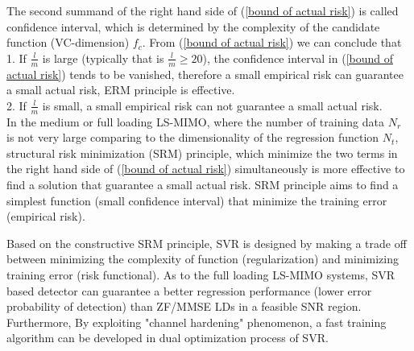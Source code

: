 \documentclass[10pt, draftclsnofoot, onecolumn]{IEEEtran}
\begin{document}
The second summand of the right hand side of (\ref{bound of actual risk}) is called confidence interval, which is determined by the complexity of the candidate function (VC-dimension) $f_{c}$\cite{vapnik1999overview}. From (\ref{bound of actual risk}) we can conclude that\\
1. If $\frac{l}{m}$ is large (typically that is $\frac{l}{m}\geq 20$), the confidence interval in (\ref{bound of actual risk}) tends to be vanished, therefore a small empirical risk can guarantee a small actual risk, ERM principle is effective.\\
2. If $\frac{l}{m}$ is small, a small empirical risk can not guarantee a small actual risk.\\
In the medium or full loading LS-MIMO, where the number of training data $N_{r}$ is not very large comparing to the dimensionality of the regression function $N_{t}$, structural risk minimization (SRM) principle, which minimize the two terms in the right hand side of (\ref{bound of actual risk}) simultaneously is more effective to find a solution that guarantee a small actual risk. SRM principle aims to find a simplest function (small confidence interval) that minimize the training error (empirical risk).

Based on the constructive SRM principle, SVR is designed by making a trade off between minimizing the complexity of function (regularization) and minimizing training error (risk functional). As to the full loading LS-MIMO systems, SVR based detector can guarantee a better regression performance (lower error probability of detection) than ZF/MMSE LDs in a feasible SNR region. Furthermore, By exploiting "channel hardening" phenomenon\cite{hochwald2004multiple}, a fast training algorithm can be developed in dual optimization process of SVR.
  
%
%
\end{document}
